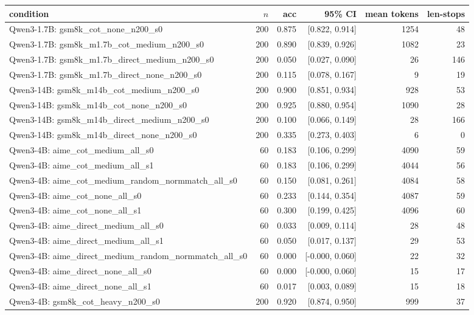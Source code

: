 \begin{tabular}{lrrrrr}
\toprule
condition & $n$ & acc & 95\% CI & mean tokens & len-stops \\
\midrule
Qwen3-1.7B: gsm8k\_cot\_none\_n200\_s0 & 200 & 0.875 & [0.822, 0.914] & 1254 & 48 \\
Qwen3-1.7B: gsm8k\_m1.7b\_cot\_medium\_n200\_s0 & 200 & 0.890 & [0.839, 0.926] & 1082 & 23 \\
Qwen3-1.7B: gsm8k\_m1.7b\_direct\_medium\_n200\_s0 & 200 & 0.050 & [0.027, 0.090] & 26 & 146 \\
Qwen3-1.7B: gsm8k\_m1.7b\_direct\_none\_n200\_s0 & 200 & 0.115 & [0.078, 0.167] & 9 & 19 \\
Qwen3-14B: gsm8k\_m14b\_cot\_medium\_n200\_s0 & 200 & 0.900 & [0.851, 0.934] & 928 & 53 \\
Qwen3-14B: gsm8k\_m14b\_cot\_none\_n200\_s0 & 200 & 0.925 & [0.880, 0.954] & 1090 & 28 \\
Qwen3-14B: gsm8k\_m14b\_direct\_medium\_n200\_s0 & 200 & 0.100 & [0.066, 0.149] & 28 & 166 \\
Qwen3-14B: gsm8k\_m14b\_direct\_none\_n200\_s0 & 200 & 0.335 & [0.273, 0.403] & 6 & 0 \\
Qwen3-4B: aime\_cot\_medium\_all\_s0 & 60 & 0.183 & [0.106, 0.299] & 4090 & 59 \\
Qwen3-4B: aime\_cot\_medium\_all\_s1 & 60 & 0.183 & [0.106, 0.299] & 4044 & 56 \\
Qwen3-4B: aime\_cot\_medium\_random\_normmatch\_all\_s0 & 60 & 0.150 & [0.081, 0.261] & 4084 & 58 \\
Qwen3-4B: aime\_cot\_none\_all\_s0 & 60 & 0.233 & [0.144, 0.354] & 4087 & 59 \\
Qwen3-4B: aime\_cot\_none\_all\_s1 & 60 & 0.300 & [0.199, 0.425] & 4096 & 60 \\
Qwen3-4B: aime\_direct\_medium\_all\_s0 & 60 & 0.033 & [0.009, 0.114] & 28 & 48 \\
Qwen3-4B: aime\_direct\_medium\_all\_s1 & 60 & 0.050 & [0.017, 0.137] & 29 & 53 \\
Qwen3-4B: aime\_direct\_medium\_random\_normmatch\_all\_s0 & 60 & 0.000 & [-0.000, 0.060] & 22 & 32 \\
Qwen3-4B: aime\_direct\_none\_all\_s0 & 60 & 0.000 & [-0.000, 0.060] & 15 & 17 \\
Qwen3-4B: aime\_direct\_none\_all\_s1 & 60 & 0.017 & [0.003, 0.089] & 15 & 18 \\
Qwen3-4B: gsm8k\_cot\_heavy\_n200\_s0 & 200 & 0.920 & [0.874, 0.950] & 999 & 37 \\

\end{tabular}

